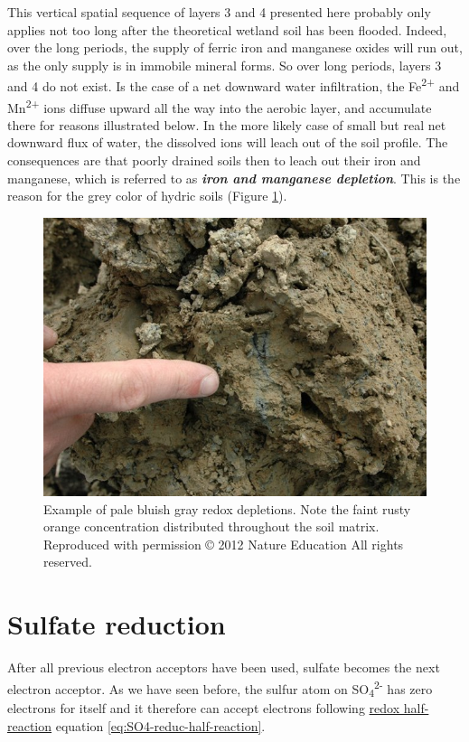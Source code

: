 \documentclass[]{book}
\theoremstyle{definition}
\theoremstyle{definition}
\theoremstyle{definition}
\theoremstyle{remark}
\begin{document}
This vertical spatial sequence of layers 3 and 4 presented here probably
only applies not too long after the theoretical wetland soil has been
flooded. Indeed, over the long periods, the supply of ferric iron and
manganese oxides will run out, as the only supply is in immobile mineral
forms. So over long periods, layers 3 and 4 do not exist. Is the case of
a net downward water infiltration, the Fe\textsuperscript{2+} and
Mn\textsuperscript{2+} ions diffuse upward all the way into the aerobic
layer, and accumulate there for reasons illustrated below. In the more
likely case of small but real net downward flux of water, the dissolved
ions will leach out of the soil profile. The consequences are that
poorly drained soils then to leach out their iron and manganese, which
is referred to as \emph{\textbf{iron and manganese depletion}}. This is
the reason for the grey color of hydric soils (Figure
\ref{fig:Fe-depletion}).

\begin{figure}

{\centering \includegraphics[width=0.75\linewidth]{pictures/hydric-soil} 

}

\caption{Example of pale bluish gray redox depletions. Note the faint rusty orange concentration distributed throughout the soil matrix. Reproduced with permission © 2012 Nature Education All rights reserved.}\label{fig:Fe-depletion}
\end{figure}

\section{Sulfate reduction}\label{sulfate-reduction}

After all previous electron acceptors have been used, sulfate becomes
the next electron acceptor. As we have seen before, the sulfur atom on
SO\textsubscript{4}\textsuperscript{2-} has zero electrons for itself
and it therefore can accept electrons following
\href{redox-half-reactions}{redox half-reaction} equation
\eqref{eq:SO4-reduc-half-reaction}.
\end{document}
